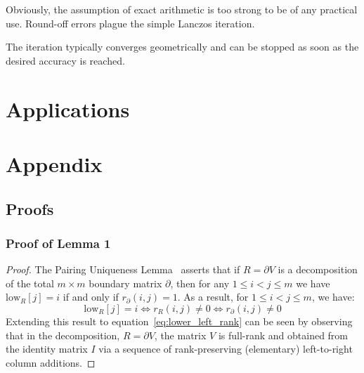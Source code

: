 \documentclass[10pt]{article}
\newcommand{\+}{%
	\raisebox{0.18ex}{\scaleobj{0.55}{+}}
}
\begin{document}
Obviously, the assumption of exact arithmetic is too strong to be of any practical use. Round-off errors plague the simple Lanczos iteration.  




The iteration typically converges geometrically and can be stopped as soon as the desired accuracy is reached.

%

\section{Applications}

\newpage 
%



\appendix
\section{Appendix}

\subsection{Proofs}
\subsubsection*{Proof of Lemma 1}
\begin{proof}
	The Pairing Uniqueness Lemma~\cite{dey2022computational} asserts that if $R = \partial V$ is a decomposition of the total $m \times m$ boundary matrix $\partial$, then for any $1 \leq i < j \leq m$ we have $\mathrm{low}_R[j] = i$ if and only if $r_\partial(i,j) = 1$. 
	As a result, for $1 \leq i < j \leq m$, we have:
\begin{equation}
	\mathrm{low}_R[j] = i \iff r_R(i,j) \neq 0 \iff r_\partial(i,j) \neq 0
\end{equation} 
Extending this result to equation~\eqref{eq:lower_left_rank} can be seen by observing that in the decomposition, $R = \partial V$, the matrix $V$ is full-rank and obtained from the identity matrix $I$ via a sequence of rank-preserving (elementary) left-to-right column additions.  
\end{proof}
\end{document}
